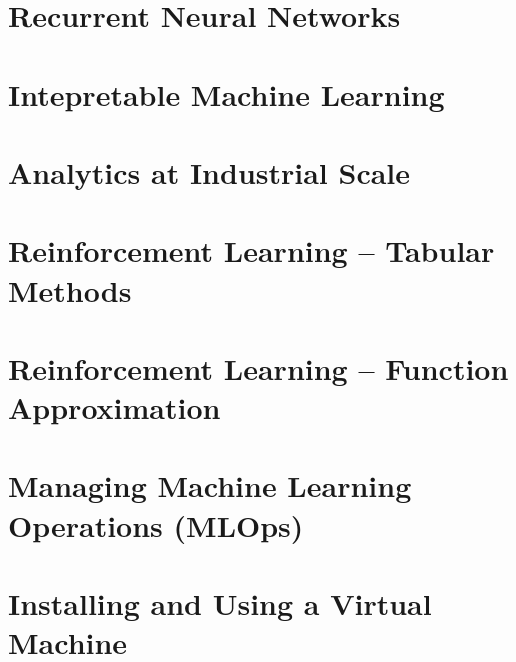 \documentclass{book}
\begin{document}
\graphicspath{{class17/}}
\chapter{Recurrent Neural Networks}


\graphicspath{{class19/}}
\chapter{Intepretable Machine Learning}


\graphicspath{{class20/}}
\chapter{Analytics at Industrial Scale}


\graphicspath{{class21/}}
\chapter{Reinforcement Learning -- Tabular Methods}


\graphicspath{{class22/}}
\chapter{Reinforcement Learning -- Function Approximation}


\graphicspath{{class23/}}
\chapter{Managing Machine Learning Operations (MLOps)}


%

\appendix
\graphicspath{{vm/}}
\chapter{Installing and Using a Virtual Machine}


\backmatter

%

\printindex
\end{document}
